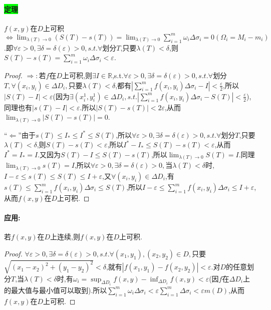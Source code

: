 \documentclass[UTF8]{ctexart}
\begin{document}
    \paragraph{\colorbox{lime}{定理}}$f(x,y)$在$D$上可积$\Leftrightarrow \lim_{\lambda(T)\to0}(S(T)-s(T))=\lim_{\lambda(T)\to0}\sum_{i=1}^m\omega_i\Delta\sigma_i=0(\Omega_i=M_i-m_i)$.即$\forall\varepsilon>0,\exists\delta=\delta(\varepsilon)>0,s.t.\forall$划分$T$,只要$\lambda(T)<\delta$,则$S(T)-s(T)=\sum_{i=1}^m\omega_i\Delta\sigma_i<\varepsilon$.
    \begin{proof}
        $\Rightarrow:$若$f$在$D$上可积,则$\exists I\in\mathbb{R}$,s.t.$\forall\varepsilon>0,\exists\delta=\delta(\varepsilon)>0,s.t.\forall$划分$T,\forall(x_i,y_i)\in\Delta D_i,$只要$\lambda(T)<\delta$,都有$|\sum_{i=1}^mf(x_i,y_i)\Delta\sigma_i-I|<\frac{\varepsilon}{2}$,所以$|S(T)-I|<\varepsilon$(因为$\exists(x_i^1,y_i^1)\in\Delta D_i,s.t.|\sum_{i=1}^mf(x_i,y_i)\Delta\sigma_i-S(T)|<\frac{\varepsilon}{2}$),同理也有$|s(T)-I|<\varepsilon$.所以$|S(T)-s(T)|<2\varepsilon$,从而$\lim_{\lambda(T)\to0}|S(T)-s(T)|=0$.

        ``$\Leftarrow$''由于$s(T)\le I_*\le I^*\le S(T)$,所以$\forall\varepsilon>0,\exists\delta=\delta(\varepsilon)>0,s.t.\forall$划分$T$,只要$\lambda(T)<\delta$,则$S(T)-s(T)<\varepsilon$,所以$I^*-I_*\le S(T)-s(T)<\varepsilon$,从而$I^*=I_*=I$.又因为$S(T)-I\le S(T)-s(T)$,所以$\lim_{\lambda(T)\to0}S(T)=I$.同理$\lim_{\lambda(T)\to0}s(T)=I$,所以$\forall\varepsilon>0,\exists\delta=\delta(\varepsilon)>0,$当$\lambda(T)<\delta$时,$I-\varepsilon\le s(T)\le S(T)\le I+\varepsilon$,又$\forall(x_i,y_i)\in\Delta D_i$,有$s(T)\le \sum_{i=1}^mf(x_i,y_i)\Delta\sigma_i\le S(T)$,所以$I-\varepsilon\le \sum_{i=1}^mf(x_i,y_i)\Delta\sigma_i\le I+\varepsilon$,从而$f(x,y)$在$D$上可积.
    \end{proof}

    \paragraph{应用:}若$f(x,y)$在$D$上连续,则$f(x,y)$在$D$上可积.
    \begin{proof}
        $\forall\varepsilon>0,\exists\delta=\delta(\varepsilon)>0,s.t.\forall(x_1,y_1),(x_2,y_2)\in D,$只要$\sqrt{(x_1-x_2)^2+(y_1-y_2)^2}<\delta$,就有$|f(x_1,y_1)-f(x_2,y_2)|<\varepsilon$.对$D$的任意划分$T$,当$\lambda(T)<\delta$时,有$\omega_i=\sup_{\Delta D_i}f(x,y)-\inf_{\Delta D_i}f(x,y)<\varepsilon$(因$f$在$\Delta D_i$上的最大值与最小值可以取到).所以$\sum_{i=1}^m\omega_i\Delta\sigma_i<\varepsilon\sum_{i=1}^m\Delta\sigma_i<\varepsilon m(D)$,从而$f(x,y)$在$D$上可积.
    \end{proof}
\end{document}
